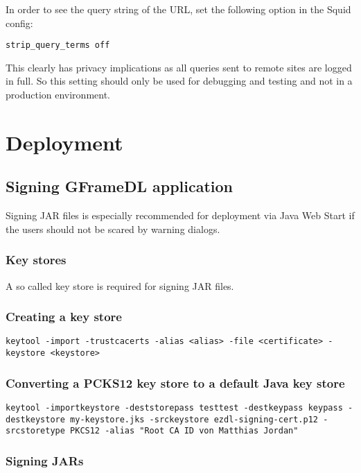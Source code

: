 \documentclass[12pt]{book}
\begin{document}
In order to see the query string of the URL, set the following option in the Squid config:

\begin{verbatim}
strip_query_terms off
\end{verbatim}

This clearly has privacy implications as all queries sent to remote sites are logged in full. So this setting should only be used for debugging and testing and not in a production environment.



\chapter{Deployment}

\section{Signing GFrameDL application}

Signing JAR files is especially recommended for deployment via Java Web Start if the users should not be scared by warning dialogs.

\subsection{Key stores}
A so called key store is required for signing JAR files.

\subsection{Creating a key store}
\begin{verbatim}
keytool -import -trustcacerts -alias <alias> -file <certificate> -keystore <keystore>
\end{verbatim}

\subsection{Converting a PCKS12 key store to a default Java key store}
\begin{verbatim}
keytool -importkeystore -deststorepass testtest -destkeypass keypass -destkeystore my-keystore.jks -srckeystore ezdl-signing-cert.p12 -srcstoretype PKCS12 -alias "Root CA ID von Matthias Jordan"
\end{verbatim}


\subsection{Signing JARs}
\end{document}
